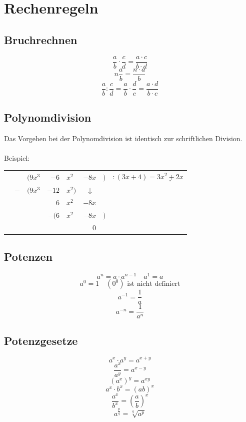 \section{Rechenregeln}
\subsection{Bruchrechnen}
\[ \boxed{\frac{a}{b} \cdot \frac{c}{d} = \frac{a \cdot c}{b \cdot d}} \]
\[ \boxed{n \frac{a}{b} = \frac{n \cdot a}{b}} \]
\[ \boxed{\frac{a}{b} : \frac{c}{d} = \frac{a}{b} \cdot \frac{d}{c} = \frac{a \cdot d}{b \cdot c}} \]

\subsection{Polynomdivision}
Das Vorgehen bei der Polynomdivision ist identisch zur schriftlichen Division. \\\\
Beispiel: 

\begin{tabular}{|r@{}r@{}r@{}r@{}l@{}r@{}r@{}l|}
\hline
\rule{0pt}{12pt}&&$(9x^3 $&$- 6$&$x^2 $&$- 8x$&$)$&$:(3x + 4) = \underline{\underline{3x^2 + 2x}}$\\
&$-$&$(9x^3 $&$- 12$&$x^2)$&$\downarrow\,\,$&&\\
\cline{2-5}\rule{0pt}{12pt}&&&$6$&$x^2 $&$- 8x$&&\\
&&&$-(6$&$x^2 $&$- 8x$&$)$&\\
\cline{4-7}\rule{0pt}{12pt}&&&&&$0$&&\\
\hline
\end{tabular}


\subsection{Potenzen}
\[ \boxed{a^n = a \cdot a^{n-1} \quad a^1 = a} \]
\[ \boxed{a^0 = 1 \quad \left(0^0\right)\text{ ist nicht definiert}} \]
\[ \boxed{a^{-1} = \frac{1}{a}} \]
\[ \boxed{a^{-n} = \frac{1}{a^n}} \]

\subsection{Potenzgesetze}
\[ \boxed{a^x \cdot a^y = a^{x+y}} \]
\[ \boxed{\frac{a^x}{a^y} = a^{x-y}} \]
\[ \boxed{(a^x)^y = a^{xy}} \]
\[ \boxed{a^x \cdot b^x = \left(ab\right)^x} \]
\[ \boxed{\frac{a^x}{b^x} = \left(\frac{a}{b}\right)^x} \]
\[ \boxed{a^{\frac{p}{q}} = \sqrt[q]{a^p}} \]

